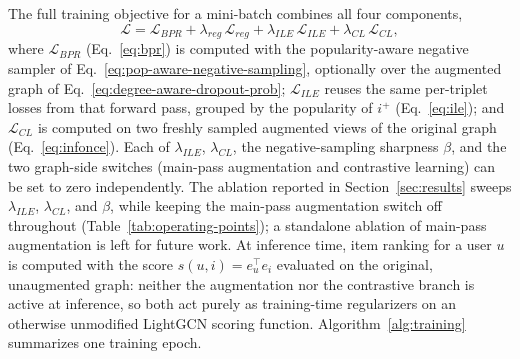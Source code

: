 The full training objective for a mini-batch combines all four components,
\begin{equation}
    \mathcal{L} = \mathcal{L}_{BPR} + \lambda_{reg}\,\mathcal{L}_{reg}
                + \lambda_{ILE}\, \mathcal{L}_{ILE} + \lambda_{CL}\, \mathcal{L}_{CL},
    \label{eq:total-loss}
\end{equation}
where $\mathcal{L}_{BPR}$ (Eq.~\eqref{eq:bpr}) is computed with the popularity-aware negative
sampler of Eq.~\eqref{eq:pop-aware-negative-sampling}, optionally over the augmented graph of
Eq.~\eqref{eq:degree-aware-dropout-prob}; $\mathcal{L}_{ILE}$ reuses the same per-triplet
losses from that forward pass, grouped by the popularity of $i^+$ (Eq.~\eqref{eq:ile}); and
$\mathcal{L}_{CL}$ is computed on two freshly sampled augmented views of the original graph
(Eq.~\eqref{eq:infonce}). Each of $\lambda_{ILE}$, $\lambda_{CL}$, the negative-sampling
sharpness $\beta$, and the two graph-side switches (main-pass augmentation and contrastive
learning) can be set to zero independently. The ablation reported in Section~\ref{sec:results}
sweeps $\lambda_{ILE}$, $\lambda_{CL}$, and $\beta$, while keeping the main-pass augmentation
switch off throughout (Table~\ref{tab:operating-points}); a standalone ablation of main-pass
augmentation is left for future work. At inference time,
item ranking for a user $u$ is computed with the score $s(u,i) = e_u^\top e_i$ evaluated on
the original, unaugmented graph: neither the augmentation nor the contrastive branch is
active at inference, so both act purely as training-time regularizers on an otherwise
unmodified LightGCN scoring function. Algorithm~\ref{alg:training} summarizes one training
epoch.

